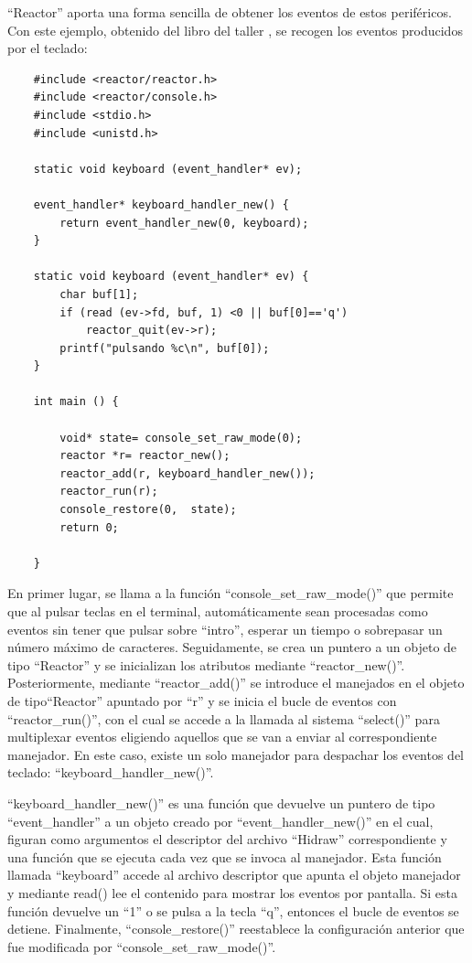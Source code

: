 ``Reactor'' aporta una forma sencilla de obtener los eventos de estos periféricos. Con este ejemplo, obtenido del libro del taller \citep{franciscotecla}, se recogen los eventos producidos por el teclado:\\

\begin{verbatim}
    #include <reactor/reactor.h>
    #include <reactor/console.h>
    #include <stdio.h>
    #include <unistd.h>
    
    static void keyboard (event_handler* ev);
   
    event_handler* keyboard_handler_new() {
    	return event_handler_new(0, keyboard);
    }
    
    static void keyboard (event_handler* ev) {
    	char buf[1];
    	if (read (ev->fd, buf, 1) <0 || buf[0]=='q')
    		reactor_quit(ev->r);
    	printf("pulsando %c\n", buf[0]);
    }
    
    int main () {
    	
    	void* state= console_set_raw_mode(0);
    	reactor *r= reactor_new();
    	reactor_add(r, keyboard_handler_new());
    	reactor_run(r);
    	console_restore(0,  state);
    	return 0;
    	
    }
    \end{verbatim}

En primer lugar, se llama a la función ``console\_set\_raw\_mode()'' que permite que al pulsar teclas en el terminal, automáticamente sean procesadas como eventos sin tener que pulsar sobre ``intro'', esperar un tiempo o sobrepasar un número máximo de caracteres. Seguidamente, se crea un puntero a un objeto de tipo ``Reactor'' y se inicializan los atributos mediante ``reactor\_new()''. Posteriormente, mediante ``reactor\_add()'' se introduce el manejados en el objeto de tipo``Reactor'' apuntado por ``r'' y se inicia el bucle de eventos con ``reactor\_run()'', con el cual se accede a la llamada al sistema ``select()'' para multiplexar eventos eligiendo aquellos que se van a enviar al correspondiente manejador. En este caso, existe un solo manejador para despachar los eventos del teclado: ``keyboard\_handler\_new()''.

``keyboard\_handler\_new()'' es una función que devuelve un puntero de tipo ``event\_handler'' a un objeto creado por ``event\_handler\_new()'' en el cual, figuran como argumentos el descriptor del archivo ``Hidraw'' correspondiente y una función que se ejecuta cada vez que se invoca al manejador. Esta función llamada ``keyboard'' accede al archivo descriptor que apunta el objeto manejador y mediante read() lee el contenido para mostrar los eventos por pantalla. Si esta función devuelve un ``1'' o se pulsa a la tecla ``q'', entonces el bucle de eventos se detiene. Finalmente, ``console\_restore()'' reestablece la configuración anterior que fue modificada por ``console\_set\_raw\_mode()''.



